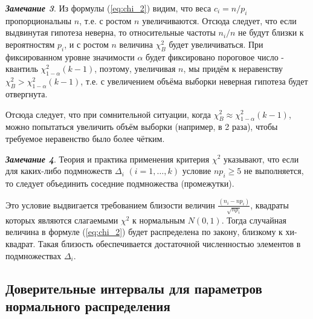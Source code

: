 \documentclass[main.tex]{subfiles}
\begin{document}
\textbf{\textit{Замечание 3}}. Из формулы (\ref{eq:chi_2}) видим, что веса $c_i = n/p_{i}$ пропорциональны $n$, т.е. с ростом $n$ увеличиваются. Отсюда следует, что если выдвинутая гипотеза неверна, то относительные частоты $n_{i}/n$ не будут близки к вероятностям $p_{i}$, и с ростом $n$ величина  $\chi^{2}_{B}$  будет увеличиваться. При фиксированном уровне значимости $\alpha$ будет фиксировано пороговое число - квантиль $\chi^{2}_{1-\alpha}(k-1)$, поэтому, увеличивая $n$, мы придём к неравенству $\chi^{2}_{B} > \chi^{2}_{1-\alpha}(k-1)$, т.е. с увеличением объёма выборки неверная гипотеза будет отвергнута.

Отсюда следует, что при сомнительной ситуации, когда $\chi^{2}_{B} \approx \chi^{2}_{1-\alpha}(k-1)$, можно попытаться увеличить объём выборки (например, в 2 раза), чтобы требуемое неравенство было более чётким.

\textbf{\textit{Замечание 4}}. Теория и практика применения критерия  $\chi^{2}$ указывают, что если для каких-либо подмножеств $\Delta_{i}$ $(i = 1, \dots ,k)$ условие $np_{i} \geq 5$ не выполняется, то следует объединить соседние подмножества (промежутки).

Это условие выдвигается требованием близости величин $\frac{(n_{i} -np_{i})}{\sqrt{np_{i}}}$, квадраты которых являются слагаемыми $\chi^{2}$  к нормальным $N(0,1)$. Тогда случайная величина в формуле (\ref{eq:chi_2}) будет распределена по закону, близкому к хи-квадрат. Такая близость обеспечивается достаточной численностью элементов в подмножествах $\Delta_{i}$.

\subsection{Доверительные интервалы для параметров нормального распределения}
\end{document}
